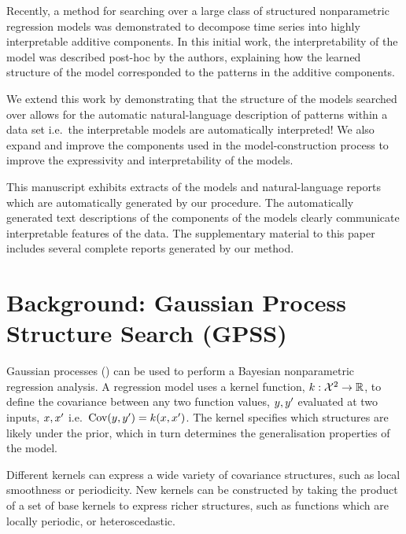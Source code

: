 \documentclass{article}
\def\ie{i.e.\ }
\begin{document}
Recently, a method for searching over a large class of structured nonparametric regression models \citep{DuvLloGroetal13} was demonstrated to decompose time series into highly interpretable additive components.
In this initial work, the interpretability of the model was described post-hoc by the authors, explaining how the learned structure of the model corresponded to the patterns in the additive components.

We extend this work by demonstrating that the structure of the models searched over allows for the automatic natural-language description of patterns within a data set \ie the interpretable models are automatically interpreted!
We also expand and improve the components used in the model-construction process to improve the expressivity and interpretability of the models.

This manuscript exhibits extracts of the models and natural-language reports which are automatically generated by our procedure.
The automatically generated text descriptions of the components of the models clearly communicate interpretable features of the data.
The supplementary material to this paper includes several complete reports generated by our method.

\section{Background: Gaussian Process Structure Search (GPSS)}
\label{sec:gpss}

Gaussian processes (\gp{}) \citep{rasmussen38gaussian} can be used to perform a Bayesian nonparametric regression analysis.
A \gp{} regression model uses a kernel function, ${k : \mathcal{X}^2 \to \mathbb{R}}$, to define the covariance between any two function values, $y, y'$ evaluated at two inputs, $x,x'$ \ie ${\textrm{Cov}(y, y') = k(x,x')}$.
The kernel specifies which structures are likely under the \gp{} prior, which in turn determines the generalisation properties of the model.

Different kernels can express a wide variety of covariance structures, such as local smoothness or periodicity.
New kernels can be constructed by taking the product of a set of base kernels to express richer structures, such as functions which are locally periodic, or heteroscedastic.
\end{document}
